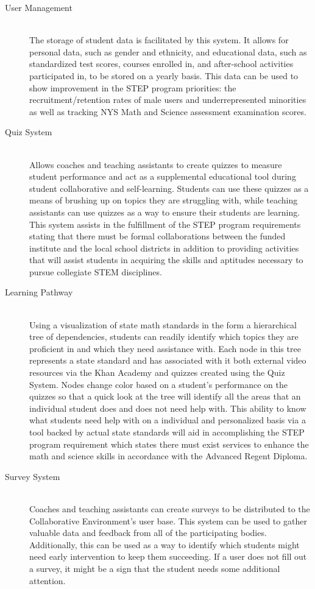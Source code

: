\begin{description}
	\item [User Management] \hfill \\ The storage of student data is facilitated by this system. It allows for personal data, such as gender and ethnicity, and educational data, such as standardized test scores, courses enrolled in, and after-school activities participated in, to be stored on a yearly basis. This data can be used to show improvement in the STEP program priorities: the recruitment/retention rates of male users and underrepresented minorities as well as tracking NYS Math and Science assessment examination scores.
	\item [Quiz System] \hfill \\ Allows coaches and teaching assistants to create quizzes to measure student performance and act as a supplemental educational tool during student collaborative and self-learning. Students can use these quizzes as a means of brushing up on topics they are struggling with, while teaching assistants can use quizzes as a way to ensure their students are learning. This system assists in the fulfillment of the STEP program requirements stating that there must be formal collaborations between the funded institute and the local school districts in addition to providing activities that will assist students in acquiring the skills and aptitudes necessary to pursue collegiate STEM disciplines.
	\item [Learning Pathway] \hfill \\ Using a visualization of state math standards in the form a hierarchical tree of dependencies, students can readily identify which topics they are proficient in and which they need assistance with. Each node in this tree represents a state standard and has associated with it both external video resources via the Khan Academy and quizzes created using the Quiz System. Nodes change color based on a student's performance on the quizzes so that a quick look at the tree will identify all the areas that an individual student does and does not need help with. This ability to know what students need help with on a individual and personalized basis via a tool backed by actual state standards will aid in accomplishing the STEP program requirement which states there must exist services to enhance the math and science skills in accordance with the Advanced Regent Diploma.
	\item [Survey System] \hfill \\ Coaches and teaching assistants can create surveys to be distributed to the Collaborative Environment's user base. This system can be used to gather valuable data and feedback from all of the participating bodies. Additionally, this can be used as a way to identify which students might need early intervention to keep them succeeding. If a user does not fill out a survey, it might be a sign that the student needs some additional attention.

\end{description}
